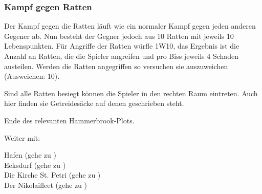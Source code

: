 \newpage
\subsubsection{Kampf gegen Ratten}
\label{kampf3}

Der Kampf gegen die Ratten läuft wie ein normaler Kampf gegen jeden anderen Gegener ab. Nun besteht der Gegner jedoch aus 10 Ratten mit jeweils 10 Lebenspunkten. Für Angriffe der Ratten würfle 1W10, das Ergebnis ist die Anzahl an Ratten, die die Spieler angreifen und pro Biss jeweils 4 Schaden austeilen. Werden die Ratten angegriffen so versuchen sie auszuweichen (Ausweichen: 10).


Sind alle Ratten besiegt können die Spieler in den rechten Raum eintreten. Auch hier finden sie Getreidesäcke auf denen  geschrieben steht.

Ende des relevanten Hammerbrook-Plots.

Weiter mit:

Hafen (gehe zu \blue{\ref{Hafen}}) \\
Eeksdurf (gehe zu \blue{\ref{xd}}) \\
Die Kirche St. Petri (gehe zu \blue{\ref{Petri}}) \\
Der Nikolaifleet (gehe zu \blue{\ref{Fleet}}) \\
